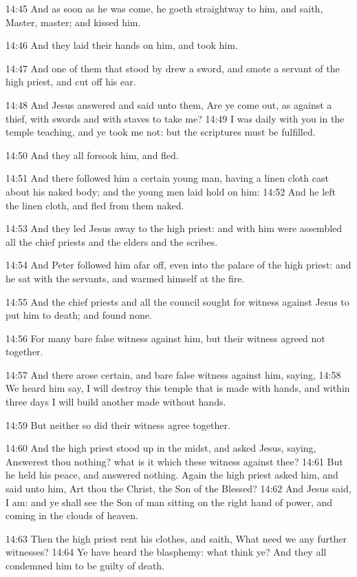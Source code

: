 14:45 And as soon as he was come, he goeth straightway to him, and
saith, Master, master; and kissed him.

14:46 And they laid their hands on him, and took him.

14:47 And one of them that stood by drew a sword, and smote a servant
of the high priest, and cut off his ear.

14:48 And Jesus answered and said unto them, Are ye come out, as
against a thief, with swords and with staves to take me?  14:49 I was
daily with you in the temple teaching, and ye took me not: but the
scriptures must be fulfilled.

14:50 And they all forsook him, and fled.

14:51 And there followed him a certain young man, having a linen cloth
cast about his naked body; and the young men laid hold on him: 14:52
And he left the linen cloth, and fled from them naked.

14:53 And they led Jesus away to the high priest: and with him were
assembled all the chief priests and the elders and the scribes.

14:54 And Peter followed him afar off, even into the palace of the
high priest: and he sat with the servants, and warmed himself at the
fire.

14:55 And the chief priests and all the council sought for witness
against Jesus to put him to death; and found none.

14:56 For many bare false witness against him, but their witness
agreed not together.

14:57 And there arose certain, and bare false witness against him,
saying, 14:58 We heard him say, I will destroy this temple that is
made with hands, and within three days I will build another made
without hands.

14:59 But neither so did their witness agree together.

14:60 And the high priest stood up in the midst, and asked Jesus,
saying, Answerest thou nothing? what is it which these witness against
thee?  14:61 But he held his peace, and answered nothing. Again the
high priest asked him, and said unto him, Art thou the Christ, the Son
of the Blessed?  14:62 And Jesus said, I am: and ye shall see the Son
of man sitting on the right hand of power, and coming in the clouds of
heaven.

14:63 Then the high priest rent his clothes, and saith, What need we
any further witnesses?  14:64 Ye have heard the blasphemy: what think
ye? And they all condemned him to be guilty of death.

